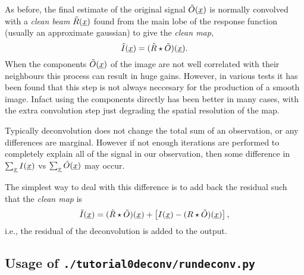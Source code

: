 As before, the final estimate of the original signal $\tilde{O}(\underline{x})$ is normally convolved with a \emph{clean beam} $\tilde{R}(\underline{x})$ found from the main lobe of the response function (usually an approximate gaussian) to give the \emph{clean map},
\[
	\tilde{I}(\underline{x}) = (\tilde{R} \star \tilde{O})(\underline{x}).
\]
When the components $\tilde{O}(\underline{x})$ of the image are not well correlated with their neighbours this process can result in huge gains. However, in various tests it has been found that this step is not always neccesary for the production of a smooth image. Infact using the components directly has been better in many cases, with the extra convolution step just degrading the spatial resolution of the map.


Typically deconvolution does not change the total sum of an observation, or any differences are marginal. However if not enough iterations are performed to completely explain all of the signal in our observation, then some difference in $\sum_{\underline{x}} I(\underline{x})$ vs $\sum_{\underline{x}} \tilde{O}(\underline{x})$ may occur.

The simplest way to deal with this difference is to add back the residual such that the \emph{clean map} is 
\[
\tilde{I}(\underline{x}) = (\tilde{R} \star \tilde{O})(\underline{x}) + \left[ I(\underline{x}) - (R \star \tilde{O})(\underline{x}) \right],
\]
i.e., the residual of the deconvolution is added to the output.



\subsection{Usage of \texttt{./tutorial{\textunderscore}0{\textunderscore}deconv/run{\textunderscore}deconv.py}}

